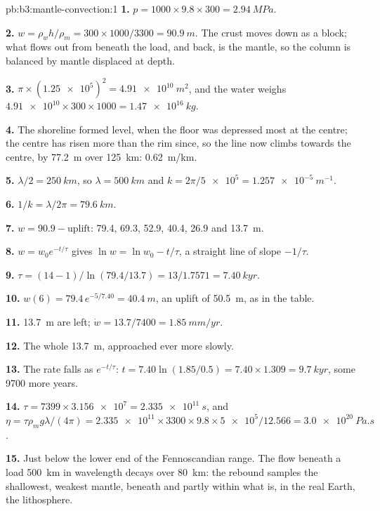 \begin{solution}{pb:b3:mantle-convection:1}
\textbf{1.} $p = 1000\times9.8\times300 = \qty{2.94}{MPa}$.

\textbf{2.} $w = \rho_wh/\rho_m = 300\times1000/3300 = \qty{90.9}{m}$. The crust
moves down as a block; what flows out from beneath the load, and back, is the
mantle, so the column is balanced by mantle displaced at depth.

\textbf{3.} $\pi\times(\num{1.25e5})^2 = \qty{4.91e10}{m^2}$, and the water
weighs $\num{4.91e10}\times300\times1000 = \qty{1.47e16}{kg}$.

\textbf{4.} The shoreline formed level, when the floor was depressed most at
the centre; the centre has risen more than the rim since, so the line now
climbs towards the centre, by \qty{77.2}{m} over \qty{125}{km}:
\qty{0.62}{m/km}.

\textbf{5.} $\lambda/2 = \qty{250}{km}$, so $\lambda = \qty{500}{km}$ and $k =
2\pi/\num{5e5} = \qty{1.257e-5}{m^{-1}}$.

\textbf{6.} $1/k = \lambda/2\pi = \qty{79.6}{km}$.

\textbf{7.} $w = 90.9 - \text{uplift}$: 79.4, 69.3, 52.9, 40.4, 26.9 and
\qty{13.7}{m}.

\textbf{8.} $w = w_0e^{-t/\tau}$ gives $\ln w = \ln w_0 - t/\tau$, a straight line
of slope $-1/\tau$.

\textbf{9.} $\tau = (14 - 1)/\ln(79.4/13.7) = 13/1.7571 = \qty{7.40}{kyr}$.

\textbf{10.} $w(6) = 79.4\,e^{-5/7.40} = \qty{40.4}{m}$, an uplift of
\qty{50.5}{m}, as in the table.

\textbf{11.} \qty{13.7}{m} are left; $\dot w = 13.7/7400 = \qty{1.85}{mm/yr}$.

\textbf{12.} The whole \qty{13.7}{m}, approached ever more slowly.

\textbf{13.} The rate falls as $e^{-t/\tau}$: $t = 7.40\ln(1.85/0.5) =
7.40\times1.309 = \qty{9.7}{kyr}$, some 9700 more years.

\textbf{14.} $\tau = 7399\times\num{3.156e7} = \qty{2.335e11}{s}$, and $\eta =
\tau\rho_mg\lambda/(4\pi) = \num{2.335e11}\times3300\times9.8\times\num{5e5}/
12.566 = \qty{3.0e20}{Pa.s}$.

\textbf{15.} Just below the lower end of the Fennoscandian range. The flow
beneath a load \qty{500}{km} in wavelength decays over \qty{80}{km}: the
rebound samples the shallowest, weakest mantle, beneath and partly within what
is, in the real Earth, the lithosphere.


\end{solution}
